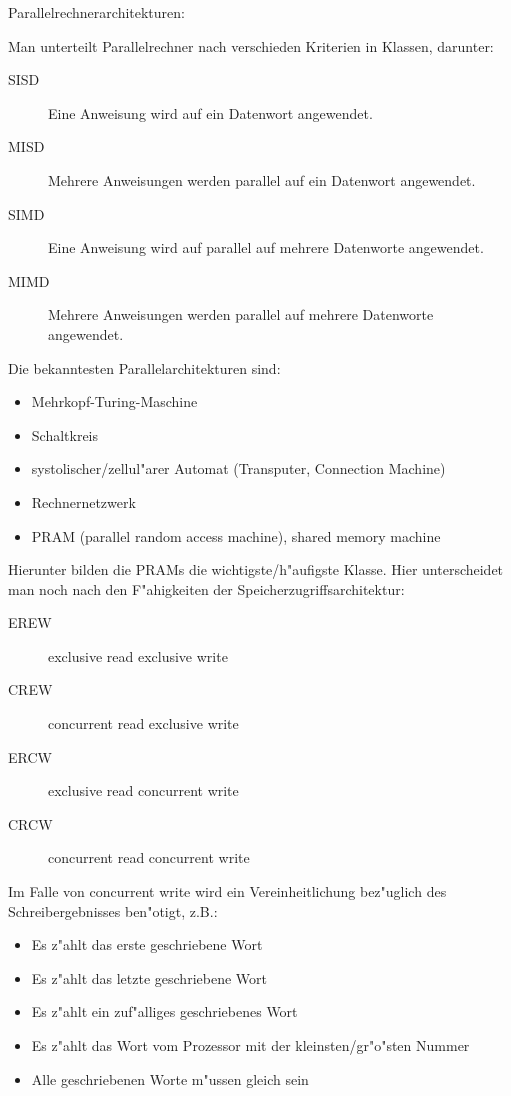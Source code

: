  Parallelrechnerarchitekturen:{
  Man unterteilt Parallelrechner nach verschieden Kriterien in Klassen, 
  darunter:
  \begin{description}
    \item[SISD] Eine Anweisung wird auf ein Datenwort angewendet.
    \item[MISD] Mehrere Anweisungen werden parallel auf ein Datenwort angewendet.
    \item[SIMD] Eine Anweisung wird auf parallel auf mehrere Datenworte angewendet.
    \item[MIMD] Mehrere Anweisungen werden parallel auf mehrere Datenworte angewendet.
  \end{description}
  Die bekanntesten Parallelarchitekturen sind:
  \begin{itemize}
    \item Mehrkopf-Turing-Maschine
    \item Schaltkreis
    \item systolischer/zellul"arer Automat (Transputer, Connection Machine)
    \item Rechnernetzwerk
    \item PRAM (parallel random access machine), shared memory machine
  \end{itemize}
  Hierunter bilden die PRAMs die wichtigste/h"aufigste Klasse. Hier 
  unterscheidet man noch nach den F"ahigkeiten der 
  Speicherzugriffsarchitektur:
  \begin{description}
    \item[EREW] exclusive read exclusive write 
    \item[CREW] concurrent read exclusive write 
    \item[ERCW] exclusive read concurrent write 
    \item[CRCW] concurrent read concurrent write 
  \end{description}
  Im Falle von concurrent write wird ein Vereinheitlichung bez"uglich
  des Schreibergebnisses ben"otigt, z.B.:
  \begin{itemize}
    \item Es z"ahlt das erste geschriebene Wort
    \item Es z"ahlt das letzte geschriebene Wort
    \item Es z"ahlt ein zuf"alliges geschriebenes Wort
    \item Es z"ahlt das Wort vom Prozessor mit der kleinsten/gr"o"sten Nummer
    \item Alle geschriebenen Worte m"ussen gleich sein
  \end{itemize}
}
